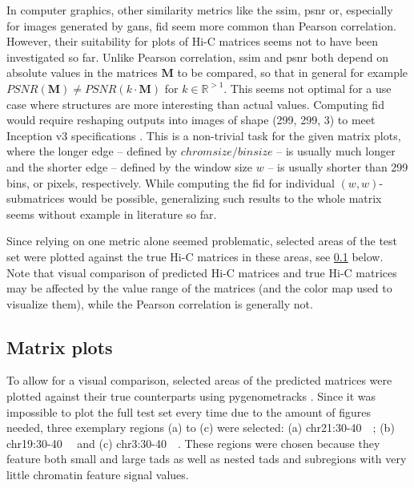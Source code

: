 In computer graphics, other similarity metrics like the \acrfull{ssim}, \acrfull{psnr} or, especially for images generated by \acrshort{gan}s, 
\acrfull{fid} seem more common than Pearson correlation.
However, their suitability for plots of Hi-C matrices seems not to have been investigated so far. 
Unlike Pearson correlation, \acrshort{ssim} and \acrshort{psnr} both depend on absolute values in the matrices $\mathbf{M}$ to be compared, 
so that in general for example $\mathit{PSNR}(\mathbf{M}) \not=\mathit{PSNR}(k\cdot \mathbf{M})$ for $k\in\mathbb{R}^{>1}$.
This seems not optimal for a use case where structures are more interesting than actual values.
Computing \acrshort{fid} would require reshaping outputs into images of shape (299, 299, 3) to meet Inception v3 specifications \cite{Szegedy2016}.
This is a non-trivial task for the given matrix plots,
where the longer edge -- defined by $\mathit{chromsize}/\mathit{binsize}$ -- is usually much longer 
and the shorter edge -- defined by the window size $w$ -- is usually shorter than 299 bins, or pixels, respectively.
While computing the \acrshort{fid} for individual $(w,w)$-submatrices would be possible,
generalizing such results to the whole matrix seems without example in literature so far.

Since relying on one metric alone seemed problematic, selected areas of the test set were plotted against the true 
Hi-C matrices in these areas, see \cref{sec:methods:matrix_plots} below.
Note that visual comparison of predicted Hi-C matrices and true Hi-C matrices may be affected by
the value range of the matrices (and the color map used to visualize them), while the Pearson correlation is generally not.

\subsection{Matrix plots} \label{sec:methods:matrix_plots}
To allow for a visual comparison, selected areas of the predicted matrices were plotted against their true counterparts using pygenometracks \cite{LopezDelisle2020}.
Since it was impossible to plot the full test set every time due to the amount of figures needed, 
three exemplary regions (a) to (c) were selected: (a) chr21:30-\SI{40}{\mega\bp}; (b) chr19:30-\SI{40}{\mega\bp} and (c) chr3:30-\SI{40}{\mega\bp}.
These regions were chosen because they feature both small and large \acrshort{tad}s as well as nested \acrshort{tad}s and subregions with very little chromatin feature signal values.


